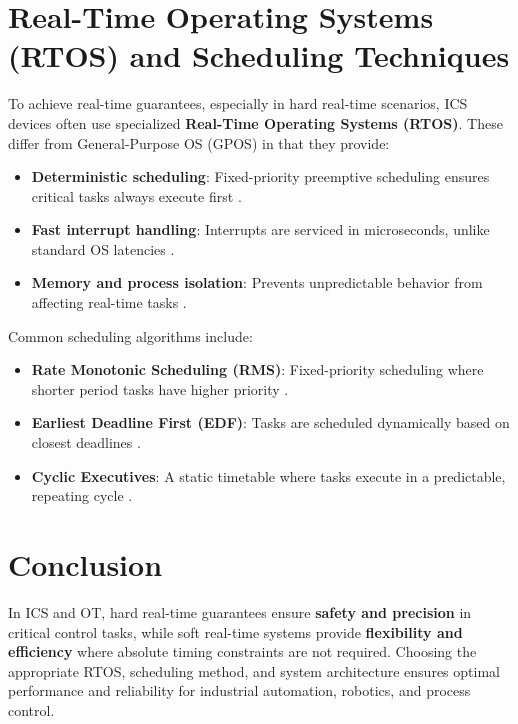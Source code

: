 \documentclass{article}
\begin{document}
\section{Real-Time Operating Systems (RTOS) and Scheduling Techniques}
To achieve real-time guarantees, especially in hard real-time scenarios, ICS devices often use specialized \textbf{Real-Time Operating Systems (RTOS)}. These differ from General-Purpose OS (GPOS) in that they provide:

\begin{itemize}
    \item \textbf{Deterministic scheduling}: Fixed-priority preemptive scheduling ensures critical tasks always execute first \cite{rtos_scheduling}.
    \item \textbf{Fast interrupt handling}: Interrupts are serviced in microseconds, unlike standard OS latencies \cite{vxworks_rtos}.
    \item \textbf{Memory and process isolation}: Prevents unpredictable behavior from affecting real-time tasks \cite{qnx_rtos}.
\end{itemize}

Common scheduling algorithms include:
\begin{itemize}
    \item \textbf{Rate Monotonic Scheduling (RMS)}: Fixed-priority scheduling where shorter period tasks have higher priority \cite{rms_scheduling}.
    \item \textbf{Earliest Deadline First (EDF)}: Tasks are scheduled dynamically based on closest deadlines \cite{edf_scheduling}.
    \item \textbf{Cyclic Executives}: A static timetable where tasks execute in a predictable, repeating cycle \cite{time_triggered}.
\end{itemize}

\section{Conclusion}
In ICS and OT, hard real-time guarantees ensure \textbf{safety and precision} in critical control tasks, while soft real-time systems provide \textbf{flexibility and efficiency} where absolute timing constraints are not required. Choosing the appropriate RTOS, scheduling method, and system architecture ensures optimal performance and reliability for industrial automation, robotics, and process control.
\end{document}
